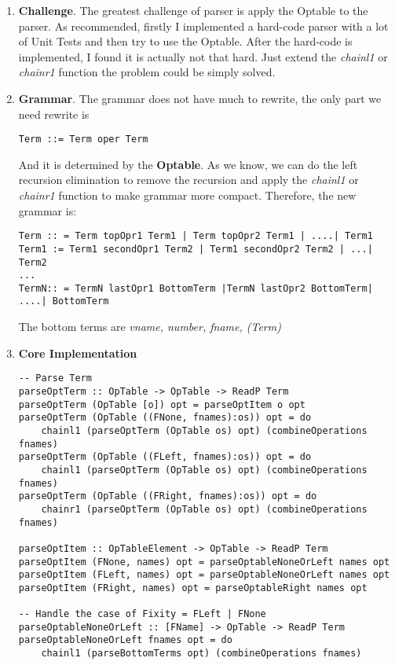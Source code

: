 \documentclass[11pt]{article}
\begin{document}
\begin{enumerate}
\item \textbf{Challenge}. The greatest challenge of parser is apply the Optable to the parser. As recommended, firstly I implemented a hard-code parser with a lot of Unit Tests and then try to use the Optable. After the hard-code is implemented, I found it is actually not that hard. Just extend the \textit{chainl1} or \textit{chainr1} function the problem could be simply solved.

\item \textbf{Grammar}. The grammar does not have much to rewrite, the only part we need rewrite is 

\begin{verbatim}
Term ::= Term oper Term
\end{verbatim}

And it is determined by the \textbf{Optable}. As we know, we can do the left recursion elimination to remove the recursion and apply the \textit{chainl1} or \textit{chainr1} function to make grammar more compact. Therefore, the new grammar is:

\begin{verbatim}
Term :: = Term topOpr1 Term1 | Term topOpr2 Term1 | ....| Term1
Term1 := Term1 secondOpr1 Term2 | Term1 secondOpr2 Term2 | ...| Term2
...
TermN:: = TermN lastOpr1 BottomTerm |TermN lastOpr2 BottomTerm| ....| BottomTerm 
\end{verbatim} 

The bottom terms are \textit{vname, number, fname, (Term)}
\item \textbf{Core Implementation}

\begin{lstlisting}
-- Parse Term
parseOptTerm :: OpTable -> OpTable -> ReadP Term
parseOptTerm (OpTable [o]) opt = parseOptItem o opt
parseOptTerm (OpTable ((FNone, fnames):os)) opt = do
    chainl1 (parseOptTerm (OpTable os) opt) (combineOperations fnames)
parseOptTerm (OpTable ((FLeft, fnames):os)) opt = do
    chainl1 (parseOptTerm (OpTable os) opt) (combineOperations fnames)
parseOptTerm (OpTable ((FRight, fnames):os)) opt = do
    chainr1 (parseOptTerm (OpTable os) opt) (combineOperations fnames)

parseOptItem :: OpTableElement -> OpTable -> ReadP Term
parseOptItem (FNone, names) opt = parseOptableNoneOrLeft names opt
parseOptItem (FLeft, names) opt = parseOptableNoneOrLeft names opt
parseOptItem (FRight, names) opt = parseOptableRight names opt

-- Handle the case of Fixity = FLeft | FNone
parseOptableNoneOrLeft :: [FName] -> OpTable -> ReadP Term
parseOptableNoneOrLeft fnames opt = do 
    chainl1 (parseBottomTerms opt) (combineOperations fnames)


\end{lstlisting}
\end{enumerate}
\end{document}
